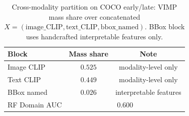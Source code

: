 
\begin{table}[ht]
\centering
\caption{Cross-modality partition on COCO early/late: VIMP mass share over concatenated $X=(\mathrm{image\_CLIP},\mathrm{text\_CLIP},\mathrm{bbox\_named})$. BBox block uses handcrafted interpretable features only.}
\label{tab:cross-modality-mass-final}
\small
\begin{tabular}{@{}l c c@{}}
\toprule
Block & Mass share & Note \\
\midrule
Image CLIP & $0.525$ & modality-level only \\
Text CLIP & $0.449$ & modality-level only \\
BBox named & $0.026$ & interpretable features \\
\midrule
RF Domain AUC & \multicolumn{2}{c}{$0.600$} \\
\bottomrule
\end{tabular}
\end{table}

